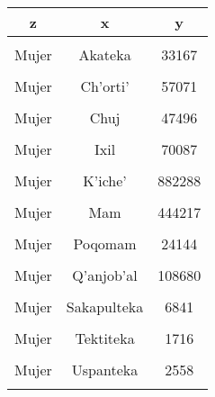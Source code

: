 \begin{table}
\centering
\begin{tabular}[t]{ccc}
\toprule
\textbf{z} & \textbf{x} & \textbf{y}\\
\midrule
\cellcolor[HTML]{B6B3FF}{Mujer} & \cellcolor[HTML]{B6B3FF}{Achi} & \cellcolor[HTML]{B6B3FF}{84649}\\
Mujer & Akateka & 33167\\
\cellcolor[HTML]{B6B3FF}{Mujer} & \cellcolor[HTML]{B6B3FF}{Awakateka} & \cellcolor[HTML]{B6B3FF}{6796}\\
Mujer & Ch'orti' & 57071\\
\cellcolor[HTML]{B6B3FF}{Mujer} & \cellcolor[HTML]{B6B3FF}{Chalchiteka} & \cellcolor[HTML]{B6B3FF}{17735}\\
Mujer & Chuj & 47496\\
\cellcolor[HTML]{B6B3FF}{Mujer} & \cellcolor[HTML]{B6B3FF}{Itza'} & \cellcolor[HTML]{B6B3FF}{1395}\\
Mujer & Ixil & 70087\\
\cellcolor[HTML]{B6B3FF}{Mujer} & \cellcolor[HTML]{B6B3FF}{Jakalteko/Popti'} & \cellcolor[HTML]{B6B3FF}{29077}\\
Mujer & K'iche' & 882288\\
\cellcolor[HTML]{B6B3FF}{Mujer} & \cellcolor[HTML]{B6B3FF}{Kaqchiquel} & \cellcolor[HTML]{B6B3FF}{548134}\\
Mujer & Mam & 444217\\
\cellcolor[HTML]{B6B3FF}{Mujer} & \cellcolor[HTML]{B6B3FF}{Mopan} & \cellcolor[HTML]{B6B3FF}{1695}\\
Mujer & Poqomam & 24144\\
\cellcolor[HTML]{B6B3FF}{Mujer} & \cellcolor[HTML]{B6B3FF}{Poqomchi'} & \cellcolor[HTML]{B6B3FF}{88987}\\
Mujer & Q'anjob'al & 108680\\
\cellcolor[HTML]{B6B3FF}{Mujer} & \cellcolor[HTML]{B6B3FF}{Q'eqchi'} & \cellcolor[HTML]{B6B3FF}{685495}\\
Mujer & Sakapulteka & 6841\\
\cellcolor[HTML]{B6B3FF}{Mujer} & \cellcolor[HTML]{B6B3FF}{Sipakapense} & \cellcolor[HTML]{B6B3FF}{8860}\\
Mujer & Tektiteka & 1716\\
\cellcolor[HTML]{B6B3FF}{Mujer} & \cellcolor[HTML]{B6B3FF}{Tz'utujil} & \cellcolor[HTML]{B6B3FF}{53668}\\
Mujer & Uspanteka & 2558\\
\cellcolor[HTML]{B6B3FF}{Hombre} & \cellcolor[HTML]{B6B3FF}{Achi} & \cellcolor[HTML]{B6B3FF}{76209}\\

\end{tabular}
\end{table}
